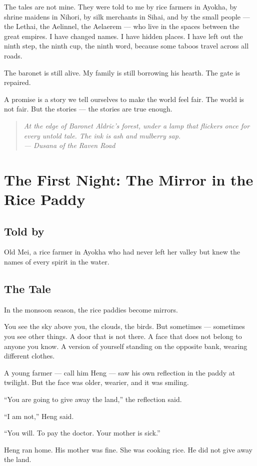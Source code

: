\documentclass[10pt,twoside]{book}
\newcommand{\dusana}[1]{\begin{quote}\itshape #1 \\ --- Dusana of the Raven Road\end{quote}}
\begin{document}
The tales are not mine. They were told to me by rice farmers in Ayokha, by shrine maidens in Nihori, by silk merchants in Sihai, and by the small people --- the Lethai, the Aelinnel, the Aelaerem --- who live in the spaces between the great empires. I have changed names. I have hidden places. I have left out the ninth step, the ninth cup, the ninth word, because some taboos travel across all roads.

The baronet is still alive. My family is still borrowing his hearth. The gate is repaired.

A promise is a story we tell ourselves to make the world feel fair. The world is not fair. But the stories --- the stories are true enough.

\dusana{At the edge of Baronet Aldric's forest, under a lamp that flickers once for every untold tale. The ink is ash and mulberry sap.}


\chapter{The First Night: The Mirror in the Rice Paddy}

\section*{Told by}
Old Mei, a rice farmer in Ayokha who had never left her valley but knew the names of every spirit in the water.

\section*{The Tale}
In the monsoon season, the rice paddies become mirrors.

You see the sky above you, the clouds, the birds. But sometimes --- sometimes you see other things. A door that is not there. A face that does not belong to anyone you know. A version of yourself standing on the opposite bank, wearing different clothes.

A young farmer --- call him Heng --- saw his own reflection in the paddy at twilight. But the face was older, wearier, and it was smiling.

``You are going to give away the land,'' the reflection said.

``I am not,'' Heng said.

``You will. To pay the doctor. Your mother is sick.''

Heng ran home. His mother was fine. She was cooking rice. He did not give away the land.
\end{document}
